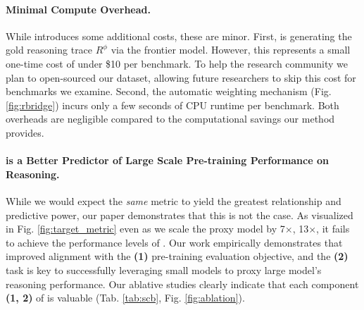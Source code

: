 \paragraph{Minimal Compute Overhead.} While  introduces some additional costs, these are minor. First, is generating the gold reasoning trace $R^\phi$ via the frontier model. However, this represents a small one-time cost of under \$10 per benchmark. To help the research community we plan to open-sourced our dataset, allowing future researchers to skip this cost for benchmarks we examine. Second, the automatic weighting mechanism (Fig. \ref{fig:rbridge}) incurs only a few seconds of CPU runtime per benchmark. Both overheads are negligible compared to the computational savings our method provides.

\paragraph{ is a Better Predictor of Large Scale Pre-training Performance on Reasoning.} While we would expect the \textit{same} metric to yield the greatest relationship and predictive power, our paper demonstrates that this is not the case. As visualized in Fig. \ref{fig:target_metric} even as we scale the proxy model by 7$\times$, 13$\times$, it fails to achieve the performance levels of . Our work empirically demonstrates that improved alignment with the \textbf{(1)} pre-training evaluation objective, and the \textbf{(2)} task is key to successfully leveraging small models to proxy large model's reasoning performance. Our ablative studies clearly indicate that each component \textbf{(1, 2)} of  is valuable 
(Tab. \ref{tab:scb}, Fig. \ref{fig:ablation}).


